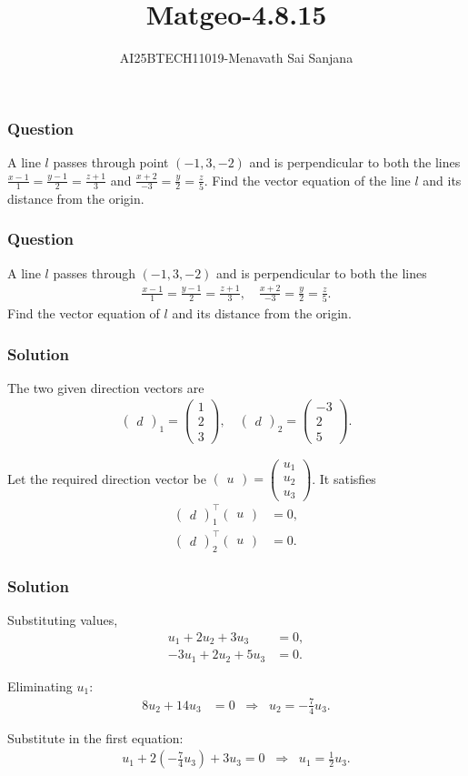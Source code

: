 \documentclass{beamer}
\title{Matgeo-4.8.15}
\author{AI25BTECH11019-Menavath Sai Sanjana}
\date{}
\theoremstyle{remark}
\renewcommand{\vec}[1]{\begin{pmatrix}#1\end{pmatrix}}
\begin{document}
  
\begin{frame}  
\titlepage  
\end{frame}  
   

\begin{frame}  
\frametitle{Question}  
A line $l$ passes through point $(-1,3,-2)$ and is perpendicular to both the lines  
$\frac{x-1}{1} = \frac{y-1}{2} = \frac{z+1}{3}$ and  
$\frac{x+2}{-3} = \frac{y}{2} = \frac{z}{5}$. Find the vector equation of the line $l$ and its distance from the origin.  
\end{frame}  

\begin{frame}
\frametitle{Question}
A line $l$ passes through $(-1,3,-2)$ and is perpendicular to both the lines  
\begin{align}
\frac{x-1}{1} = \frac{y-1}{2} = \frac{z+1}{3}, \quad
\frac{x+2}{-3} = \frac{y}{2} = \frac{z}{5}.
\end{align}
Find the vector equation of $l$ and its distance from the origin.
\end{frame}

\begin{frame}
\frametitle{Solution}

The two given direction vectors are
\begin{align}
\vec{d}_1 = \vec{1\\2\\3}, \quad 
\vec{d}_2 = \vec{-3\\2\\5}.
\end{align}

Let the required direction vector be $\vec{u}=\vec{u_1\\u_2\\u_3}$.
It satisfies
\begin{align}
\vec{d}_1^\top \vec{u} &= 0, \\
\vec{d}_2^\top \vec{u} &= 0.
\end{align}
\end{frame}

\begin{frame}
\frametitle{Solution}

Substituting values,
\begin{align}
u_1 + 2u_2 + 3u_3 &= 0, \\
-3u_1 + 2u_2 + 5u_3 &= 0.
\end{align}

Eliminating $u_1$:
\begin{align}
8u_2 + 14u_3 &= 0 \;\;\Rightarrow\;\; u_2 = -\frac{7}{4}u_3.
\end{align}

Substitute in the first equation:
\begin{align}
u_1 + 2\left(-\frac{7}{4}u_3\right) + 3u_3 = 0
\;\;\Rightarrow\;\; u_1 = \frac{1}{2}u_3.
\end{align}
\end{frame}
\end{document}

